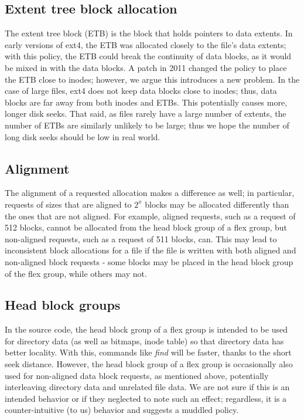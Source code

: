 \documentclass{acm_proc_article-sp}
\begin{document}
\subsection{Extent tree block allocation}
The extent tree block (ETB) is the block that holds pointers to data extents. In early versions of ext4, the ETB was allocated closely to the file's data extents; with this policy, the ETB could break the continuity of data blocks, as it would be mixed in with the data blocks. A patch in 2011 changed the policy to place the ETB close to inodes; however, we argue this introduces a new problem. In the case of large files, ext4 does not keep data blocks close to inodes; thus, data blocks are far away from both inodes and ETBs. This potentially causes more, longer disk seeks. That said, as files rarely have a large number of extents, the number of ETBs are similarly unlikely to be large; thus we hope the number of long disk seeks should be low in real world.

\subsection{Alignment}
The alignment of a requested allocation makes a difference as well; in particular, requests of sizes that are aligned to $2^x$ blocks may be allocated differently than the ones that are not aligned. For example, aligned requests, such as a request of 512 blocks, cannot be allocated from the head block group of a flex group, but non-aligned requests, such as a request of 511 blocks, can. This may lead to inconsistent block allocations for a file if the file is written with both aligned and non-aligned block requests - some blocks may be placed in the head block group of the flex group, while others may not.

\subsection{Head block groups}
In the source code, the head block group of a flex group is intended to be used for directory data (as well as bitmaps, inode table) so that directory data has better locality. With this, commands like \emph{find} will be faster, thanks to the short seek distance. However, the head block group of a flex group is occasionally also used for non-aligned data block requests, as mentioned above, potentially interleaving directory data and unrelated file data. We are not sure if this is an intended behavior or if they neglected to note such an effect; regardless, it is a counter-intuitive (to us) behavior and suggests a muddled policy.
\end{document}
